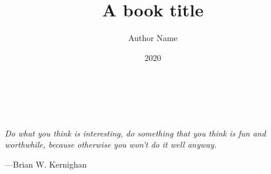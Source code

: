 \documentclass[a5paper,pagesize,10pt,bibliography=totoc,numbers=enddot,
headings=normal,DIV=9,twoside=false,tablecaptionabove]{scrbook}
\title{A book title}
\author{Author Name}
\date{2020}
\begin{document}
\makeatletter
\begin{titlepage}
		\centering{
			{\fontsize{40}{48}\selectfont 
			\@title}
		}\\
			
		\vspace{10mm}
		\centering{\Large{\@author}}\\
		\vspace{\fill}
		\centering \large{\@date}
\end{titlepage}
\makeatother

\newpage{}
\thispagestyle {empty}

\vspace*{2cm}

\begin{center}
	\Large{\parbox{10cm}{
		\begin{raggedright}
		{\Large 
			\textit{Do what you think is interesting, 
			do something that you think is fun and worthwhile, 
			because otherwise you won’t do it well anyway.}
		}
	
		\vspace{.5cm}\hfill{---Brian W. Kernighan}
		\end{raggedright}
	}
}
\end{center}

\newcommand\keywords[3]{%
	\section*{Mots-clés :}

	\textbf{Cadre} : #1

	\textbf{Genre} : #2

	\textbf{Thème} : #3
}%

\newcommand\medfan[1]{%
	\emph{medfan}
}%

\newcommand{\filltopageendgraphics}[2][]{%
  \par
  \zsaveposy{top-\thepage}%
  \vfill
  \zsaveposy{bottom-\thepage}%
  \def\thisheight{\dimexpr\zposy{top-\thepage}sp-\zposy{bottom-\thepage}sp\relax}
  \begin{figure}[h]
	\centering
	\texttt{[image: \#2]}
  \end{figure}
  \par
}%

\newcommand\illustration[1]{%
		\filltopageendgraphics{images/#1}
}%
\end{document}
